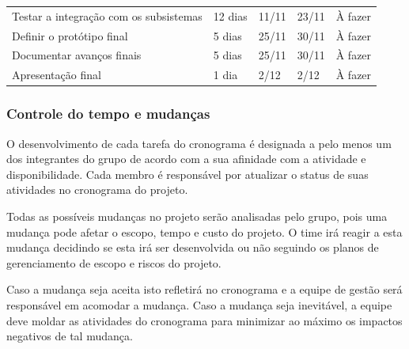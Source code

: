 \begin{table}[!htbp]
{\begin{tabular}{ l l l l l }
  \cline{1-1}\cline{2-2}\cline{3-3}\cline{4-4}\cline{5-5}  
    \multicolumn{1}{|p{6.900cm}|}{Testar a integração com os subsistemas} &
    \multicolumn{1}{p{1.817cm}|}{12 dias} &
    \multicolumn{1}{p{1.650cm}|}{11/11} &
    \multicolumn{1}{p{1.550cm}|}{23/11} &
    \multicolumn{1}{p{2.000cm}|}{À fazer}
  \\  
  \cline{1-1}\cline{2-2}\cline{3-3}\cline{4-4}\cline{5-5}  
    \multicolumn{1}{|p{6.900cm}|}{Definir o protótipo final} &
    \multicolumn{1}{p{1.817cm}|}{5 dias} &
    \multicolumn{1}{p{1.650cm}|}{25/11} &
    \multicolumn{1}{p{1.550cm}|}{30/11} &
    \multicolumn{1}{p{2.000cm}|}{À fazer}
  \\  
  \cline{1-1}\cline{2-2}\cline{3-3}\cline{4-4}\cline{5-5}  
    \multicolumn{1}{|p{6.900cm}|}{Documentar avanços finais} &
    \multicolumn{1}{p{1.817cm}|}{5 dias} &
    \multicolumn{1}{p{1.650cm}|}{25/11} &
    \multicolumn{1}{p{1.550cm}|}{30/11} &
    \multicolumn{1}{p{2.000cm}|}{À fazer}
  \\  
  \cline{1-1}\cline{2-2}\cline{3-3}\cline{4-4}\cline{5-5}  
    \multicolumn{1}{|p{6.900cm}|}{Apresentação final} &
    \multicolumn{1}{p{1.817cm}|}{1 dia} &
    \multicolumn{1}{p{1.650cm}|}{2/12} &
    \multicolumn{1}{p{1.550cm}|}{2/12} &
    \multicolumn{1}{p{2.000cm}|}{À fazer}
  \\  
  \hline

 \end{tabular} }
\end{table}


\subsubsection{Controle do tempo e mudanças}

O desenvolvimento de cada tarefa do cronograma é designada a pelo menos um dos integrantes do grupo de acordo com a sua afinidade com a atividade e disponibilidade. Cada membro é responsável por atualizar o status de suas atividades no cronograma do projeto.

Todas as possíveis mudanças no projeto serão analisadas pelo grupo, pois uma mudança pode afetar o escopo, tempo e custo do projeto. O time irá reagir a esta mudança decidindo se esta irá ser desenvolvida ou não seguindo os planos de gerenciamento de escopo e riscos do projeto.

Caso a mudança seja aceita isto refletirá no cronograma e a equipe de gestão será responsável em acomodar a mudança. Caso a mudança seja inevitável, a equipe deve moldar as atividades do cronograma para minimizar ao máximo os impactos negativos de tal mudança.

